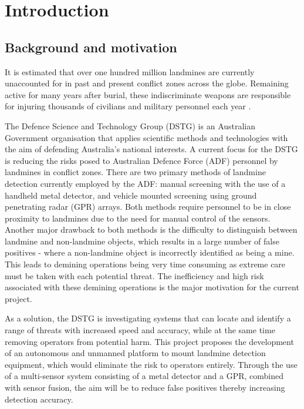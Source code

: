 \documentclass[main.tex]{subfiles}
\begin{document}

\chapter{Introduction}
\section{Background and motivation}

It is estimated that over one hundred million landmines are currently unaccounted for in past and present conflict zones across the globe. Remaining active for many years after burial, these indiscriminate weapons are responsible for injuring thousands of civilians and military personnel each year \parencite{landmineMonitor2015}.

The Defence Science and Technology Group (DSTG) is an Australian Government organisation that applies scientific methods and technologies with the aim of defending Australia's national interests. A current focus for the DSTG is reducing the risks posed to Australian Defence Force (ADF) personnel by landmines in conflict zones. There are two primary methods of landmine detection currently employed by the ADF: manual screening with the use of a handheld metal detector, and vehicle mounted screening using ground penetrating radar (GPR) arrays.
Both methods require personnel to be in close proximity to landmines due to the need for manual control of the sensors. Another major drawback to both methods is the difficulty to distinguish between landmine and non-landmine objects, which results in a large number of false positives - where a non-landmine object is incorrectly identified as being a mine. This leads to demining operations being very time consuming as extreme care must be taken with each potential threat. The inefficiency and high risk associated with these demining operations is the major motivation for the current project. 

As a solution, the DSTG is investigating systems that can locate and identify a range of threats with increased speed and accuracy, while at the same time removing operators from potential harm. 
This project proposes the development of an autonomous and unmanned platform to mount landmine detection equipment, which would eliminate the risk to operators entirely. Through the use of a multi-sensor system consisting of a metal detector and a GPR, combined with sensor fusion, the aim will be to reduce false positives thereby increasing detection accuracy.
\end{document}
